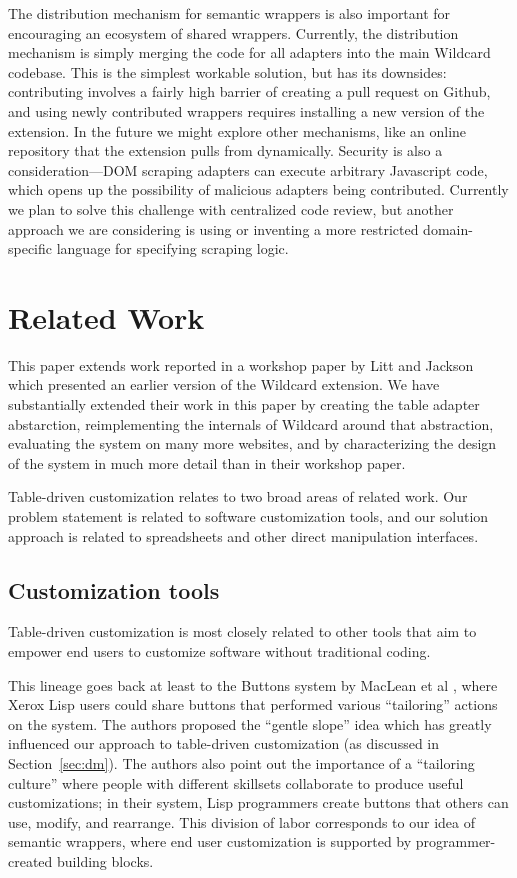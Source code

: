 \documentclass[sigplan,screen,10pt,anonymous,review]{acmart}
\begin{document}
The distribution mechanism for semantic wrappers is also important for
encouraging an ecosystem of shared wrappers. Currently, the distribution
mechanism is simply merging the code for all adapters into the main
Wildcard codebase. This is the simplest workable solution, but has its
downsides: contributing involves a fairly high barrier of creating a
pull request on Github, and using newly contributed wrappers requires
installing a new version of the extension. In the future we might
explore other mechanisms, like an online repository that the extension
pulls from dynamically. Security is also a consideration---DOM scraping
adapters can execute arbitrary Javascript code, which opens up the
possibility of malicious adapters being contributed. Currently we plan
to solve this challenge with centralized code review, but another
approach we are considering is using or inventing a more restricted
domain-specific language for specifying scraping logic.

\hypertarget{sec:related-work}{%
\section{Related Work}\label{sec:related-work}}

This paper extends work reported in a workshop paper by Litt and Jackson
\citep{litt2020} which presented an earlier version of the Wildcard
extension. We have substantially extended their work in this paper by
creating the table adapter abstarction, reimplementing the internals of
Wildcard around that abstraction, evaluating the system on many more
websites, and by characterizing the design of the system in much more
detail than in their workshop paper.

Table-driven customization relates to two broad areas of related work.
Our problem statement is related to software customization tools, and
our solution approach is related to spreadsheets and other direct
manipulation interfaces.

\hypertarget{customization-tools}{%
\subsection{Customization tools}\label{customization-tools}}

Table-driven customization is most closely related to other tools that
aim to empower end users to customize software without traditional
coding.

This lineage goes back at least to the Buttons system by MacLean et al
\citep{maclean1990}, where Xerox Lisp users could share buttons that
performed various ``tailoring'' actions on the system. The authors
proposed the ``gentle slope'' idea which has greatly influenced our
approach to table-driven customization (as discussed in
Section~\ref{sec:dm}). The authors also point out the importance of a
``tailoring culture'' where people with different skillsets collaborate
to produce useful customizations; in their system, Lisp programmers
create buttons that others can use, modify, and rearrange. This division
of labor corresponds to our idea of semantic wrappers, where end user
customization is supported by programmer-created building blocks.
\end{document}
